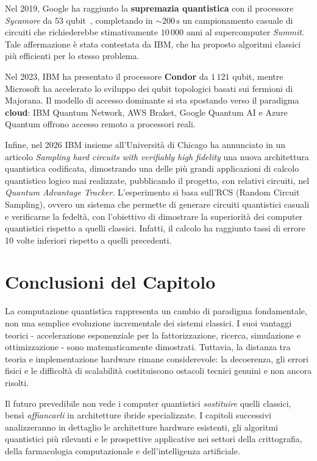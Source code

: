 Nel 2019, Google ha raggiunto la \textbf{supremazia quantistica} con il
processore \textit{Sycamore} da 53 qubit~, completando
in $\sim 200\,\text{s}$ un campionamento casuale di circuiti che richiederebbe
stimativamente $10\,000$ anni al supercomputer \textit{Summit}. Tale
affermazione è stata contestata da IBM, che ha proposto algoritmi classici più
efficienti per lo stesso problema.

Nel 2023, IBM ha presentato il processore \textbf{Condor} da $1\,121$ qubit,
mentre Microsoft ha accelerato lo sviluppo dei qubit topologici basati sui
fermioni di Majorana. Il modello di accesso dominante si sta spostando verso il
paradigma \textbf{cloud}: IBM Quantum Network, AWS Braket, Google Quantum AI e
Azure Quantum offrono accesso remoto a processori reali.

Infine, nel 2026 IBM insieme all'Università di Chicago ha annunciato in un articolo
\textit{Sampling hard circuits with verifiably high fidelity} una nuova architettura
quantistica codificata, dimostrando una delle più grandi
applicazioni di calcolo quantistico logico mai realizzate, pubblicando il progetto,
con relativi circuiti, nel \textit{Quantum Advantage Tracker}.
L'esperimento si basa sull'RCS (Random Circuit Sampling), ovvero un sistema che permette
di generare circuiti quantistici casuali e verificarne la fedeltà, con l'obiettivo di
dimostrare la superiorità dei computer quantistici rispetto a quelli classici.
Infatti, il calcolo ha raggiunto tassi di errore 10 volte inferiori rispetto a quelli precedenti.

\section{Conclusioni del Capitolo}
\label{sec:conclusioni}

La computazione quantistica rappresenta un cambio di paradigma fondamentale,
non una semplice evoluzione incrementale dei sistemi classici. I suoi vantaggi
teorici - accelerazione esponenziale per la fattorizzazione, ricerca,
simulazione e ottimizzazione - sono matematicamente dimostrati. Tuttavia, la
distanza tra teoria e implementazione hardware rimane considerevole: la
decoerenza, gli errori fisici e le difficoltà di scalabilità costituiscono
ostacoli tecnici genuini e non ancora risolti.

Il futuro prevedibile non vede i computer quantistici \textit{sostituire} quelli
classici, bensì \textit{affiancarli} in architetture ibride specializzate.
I capitoli successivi analizzeranno in dettaglio le architetture hardware
esistenti, gli algoritmi quantistici più rilevanti e le prospettive applicative
nei settori della crittografia, della farmacologia computazionale e
dell'intelligenza artificiale.
